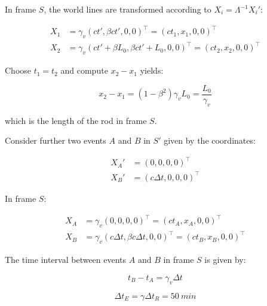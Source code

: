 \documentclass[12pt]{article}
\begin{document}
In frame $S$, the world lines are transformed according to $X_{i} = \Lambda^{-1} X_{i}'$:

\begin{equation}
\begin{split}
    X_{1} &= \gamma_{v} (ct', \beta c t', 0, 0)^{\intercal} = (ct_{1}, x_{1}, 0, 0)^{\intercal}\\
    X_{2} &= \gamma_{v} (ct' + \beta L_{0}, \beta c t' + L_{0}, 0, 0)^{\intercal} = (ct_{2}, x_{2}, 0, 0)^{\intercal}
\end{split}
\end{equation}

Choose $t_{1} = t_{2}$ and compute $x_{2} - x_{1}$ yields:

\begin{equation}
    x_{2} - x_{1} = (1 - \beta^{2}) \gamma_{v} L_{0} = \frac{L_{0}}{\gamma_{v}}
\end{equation}

which is the length of the rod in frame $S$.

Consider further two events $A$ and $B$ in $S'$ given by the coordinates:

\begin{equation}
\begin{split}
    X_{A}' &= (0, 0, 0, 0)^{\intercal} \\
    X_{B}' &= (c\Delta t, 0, 0, 0)^{\intercal}
\end{split}
\end{equation}

In frame $S$:

\begin{equation}
\begin{split}
    X_{A} &= \gamma_{v} (0, 0, 0, 0)^{\intercal} = (ct_{A}, x_{A}, 0, 0)^{\intercal} \\
    X_{B} &= \gamma_{v} (c\Delta t, \beta c \Delta t, 0, 0)^{\intercal} = (ct_{B}, x_{B}, 0, 0)^{\intercal}
\end{split}
\end{equation}

The time interval between events $A$ and $B$ in frame $S$ is given by:

\begin{equation}
    t_{B} - t_{A} = \gamma_{v} \Delta t
\end{equation}


\begin{equation}
    \Delta t_{E} = \gamma \Delta t_{R} = \qty{50}{min}
\end{equation}
\end{document}
